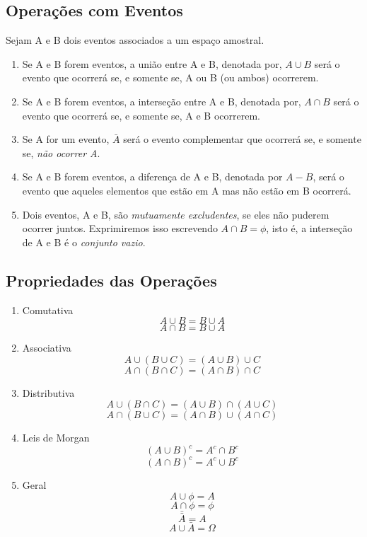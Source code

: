 \subsection{Operações com Eventos}

Sejam A e B dois eventos associados a um espaço amostral.

\begin{enumerate}
    \item Se A e B forem eventos, a união entre A e B, denotada por, $A \cup B$ será o evento que
    ocorrerá se, e somente se, A ou B (ou ambos) ocorrerem.
    \item Se A e B forem eventos, a interseção entre A e B, denotada por, $A \cap B$ será o evento que
    ocorrerá se, e somente se, A e B ocorrerem.
    \item Se A for um evento, $\bar{A}$ será o evento complementar que ocorrerá
    se, e somente se, \emph{não ocorrer A}.
    \item Se A e B forem eventos, a diferença de A e B, denotada
    por $A-B$, será o evento que aqueles elementos que estão em A mas
    não estão em B ocorrerá.
    \item Dois eventos, A e B, são \emph{mutuamente excludentes}, se eles
    não puderem ocorrer juntos. Exprimiremos isso escrevendo $A \cap B =
    \phi$, isto é, a interseção de A e B é o \emph{conjunto vazio}.
\end{enumerate}



\subsection{Propriedades das Operações}

\begin{enumerate}
    \item Comutativa
$$A \cup B = B \cup A$$
$$A \cap B = B \cup A$$
    \item Associativa
$$A \cup (B \cup C) = (A \cup B)\cup C$$
$$A \cap (B \cap C) = (A \cap B)\cap C$$
    \item Distributiva
$$A \cup (B \cap C) = (A \cup B)\cap (A \cup C)$$
$$A \cap (B \cup C) = (A \cap B)\cup (A \cap C)$$
    \item Leis de Morgan
$$ (A \cup B)^{c}= A^{c} \cap B^{c}$$
$$ (A \cap B)^{c}= A^{c} \cup B^{c}$$
\item Geral
$$ A \cup \phi = A$$
$$ A \cap \phi = \phi$$
$$ \bar{\bar{A}}=A $$
$$ A \cup \bar{A}= \Omega $$
\end{enumerate}

